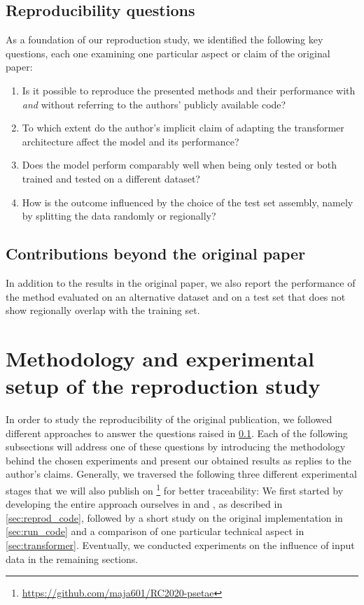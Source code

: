 \subsection{Reproducibility questions}
\label{sec:claims}

As a foundation of our reproduction study, we identified the following key questions, each one examining one particular aspect or claim of the original paper:
\begin{enumerate}
[label=\textit{\roman*)}]
  \item Is it possible to reproduce the presented methods and their performance with \emph{and} without referring to the authors' publicly available code?
  \item To which extent do the author's implicit claim of adapting the transformer architecture affect the model and its performance?
  \item Does the model perform comparably well when being only tested or both trained and tested on a different dataset?
  \item How is the outcome influenced by the choice of the test set assembly, namely by splitting the data randomly or regionally?
\end{enumerate}

\subsection{Contributions beyond the original paper}
In addition to the results in the original paper, we also report the performance of the method evaluated on an alternative dataset and on a test set that does not show regionally overlap with the training set.

\section{Methodology and experimental setup of the reproduction study}

In order to study the reproducibility of the original publication, we followed different approaches to answer the questions raised in \cref{sec:claims}.
Each of the following subsections will address one of these questions by introducing the methodology behind the chosen experiments and present our obtained results as replies to the author's claims.
Generally, we traversed the following three different experimental stages that we will also publish on \GitHub\footnote{\url{https://github.com/maja601/RC2020-psetae}} for better traceability:
We first started by developing the entire approach ourselves in \python and \pytorch \parencite{Paszke19:Pytorch}, as described in  \cref{sec:reprod_code}, followed by a short study on the original implementation in \cref{sec:run_code} and a comparison of one particular technical aspect in \cref{sec:transformer}.
Eventually, we conducted experiments on the influence of input data in the remaining sections.

